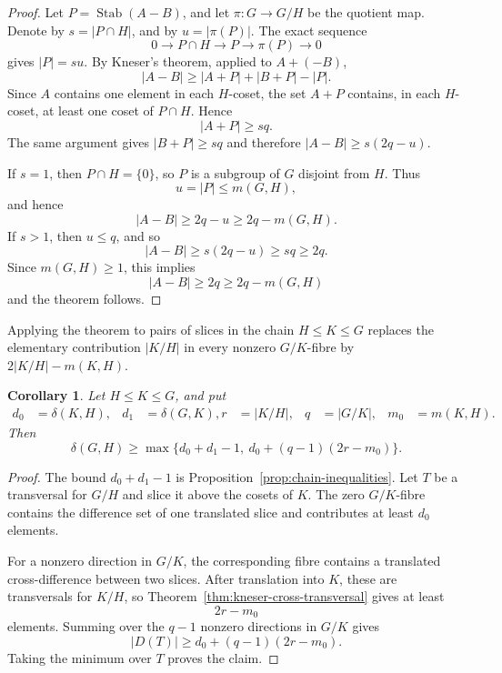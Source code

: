 \documentclass[reqno]{amsart}
\numberwithin{equation}{section}
\newtheorem{corollary}[theorem]{Corollary}
\theoremstyle{definition}
\begin{document}
\begin{proof}
Let $P=\operatorname{Stab}(A-B)$, and let $\pi:G\to G/H$ be the quotient map.
Denote by
$s=|P\cap H|$,
and by
  $u=|\pi(P)|$.
The exact sequence
\[
  0\longrightarrow P\cap H\longrightarrow P\longrightarrow \pi(P) \longrightarrow 0
\]
gives
  $|P|=su$.
By Kneser's theorem, applied to $A+(-B)$,
\[
  |A-B|\geq |A+P|+|B+P|-|P|.
\]
Since $A$ contains one element in each $H$-coset, the set $A+P$ contains, in
each $H$-coset, at least one coset of $P\cap H$.  Hence
\[
  |A+P|\geq sq.
\]
The same argument gives $|B+P|\geq sq$ and therefore
  $|A-B|\geq s(2q-u)$.

If $s=1$, then $P\cap H=\{0\}$, so $P$ is a subgroup of $G$ disjoint from $H$.
Thus
\[
  u=|P|\leq m(G,H),
\]
and hence
\[
  |A-B|\geq 2q-u\geq 2q-m(G,H).
\]
If $s>1$, then $u\leq q$, and so
\[
  |A-B|\geq s(2q-u)\geq sq\geq 2q.
\]
Since $m(G,H)\geq 1$, this implies
\[
  |A-B|\geq 2q\geq 2q-m(G,H)
\]
and the theorem follows.
\end{proof}

Applying the theorem to pairs of slices in the chain $H\leq K\leq G$ replaces
the elementary contribution $|K/H|$ in every nonzero $G/K$-fibre by
$2|K/H|-m(K,H)$.
\begin{corollary}
\label{cor:kneser-sharpened-chain-bound}
Let $H\leq K\leq G$, and put
\[
  \begin{aligned}
    d_0&=\delta(K,H),
    & d_1&=\delta(G,K),
    r&=|K/H|,
    & q&=|G/K|,
    & m_0&=m(K,H).
  \end{aligned}
\]
Then
\[
  \delta(G,H)
  \geq
  \max\{d_0+d_1-1,\ d_0+(q-1)(2r-m_0)\}.
\]
\end{corollary}

\begin{proof}
The bound $d_0+d_1-1$ is Proposition~\ref{prop:chain-inequalities}.  Let $T$ be
a transversal for $G/H$ and slice it above the cosets of $K$.  The zero
$G/K$-fibre contains the difference set of one translated slice and contributes
at least $d_0$ elements.

For a nonzero direction in $G/K$, the corresponding fibre contains a translated
cross-difference between two slices.  After translation into $K$, these are
transversals for $K/H$, so Theorem~\ref{thm:kneser-cross-transversal} gives at
least
\[
  2r-m_0
\]
elements.  Summing over the $q-1$ nonzero directions in $G/K$ gives
\[
  |D(T)|\geq d_0+(q-1)(2r-m_0).
\]
Taking the minimum over $T$ proves the claim.
\end{proof}
\end{document}
